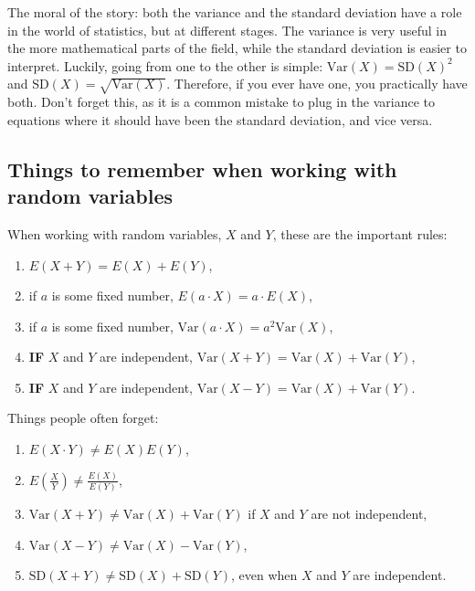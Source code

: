 \documentclass[]{book}
\providecommand{\tightlist}{%
  \setlength{\itemsep}{0pt}\setlength{\parskip}{0pt}}
\theoremstyle{definition}
\theoremstyle{definition}
\theoremstyle{definition}
\theoremstyle{remark}
\begin{document}
The moral of the story: both the variance and the standard deviation have a role in the world of statistics, but at different stages. The variance is very useful in the more mathematical parts of the field, while the standard deviation is easier to interpret. Luckily, going from one to the other is simple: \(\text{Var}(X) = \text{SD}(X)^2\) and \(\text{SD}(X) = \sqrt{\text{Var}(X)}\). Therefore, if you ever have one, you practically have both. Don't forget this, as it is a common mistake to plug in the variance to equations where it should have been the standard deviation, and vice versa.

\hypertarget{things-to-remember-when-working-with-random-variables}{%
\subsection{Things to remember when working with random variables}\label{things-to-remember-when-working-with-random-variables}}

When working with random variables, \(X\) and \(Y\), these are the important rules:

\begin{enumerate}
\def\labelenumi{\arabic{enumi}.}
\tightlist
\item
  \(E(X + Y) = E(X) + E(Y)\),
\item
  if \(a\) is some fixed number, \(E(a\cdot X) = a\cdot E(X)\),
\item
  if \(a\) is some fixed number, \(\text{Var}(a \cdot X) = a^2 \text{Var}(X)\),
\item
  \textbf{IF} \(X\) and \(Y\) are independent, \(\text{Var}(X + Y) = \text{Var}(X) + \text{Var}(Y)\),
\item
  \textbf{IF} \(X\) and \(Y\) are independent, \(\text{Var}(X - Y) = \text{Var}(X) + \text{Var}(Y)\).
\end{enumerate}

Things people often forget:

\begin{enumerate}
\def\labelenumi{\arabic{enumi}.}
\tightlist
\item
  \(E(X\cdot Y) \neq E(X)E(Y)\),
\item
  \(E\left(\frac{X}{Y}\right) \neq \frac{E(X)}{E(Y)}\),
\item
  \(\text{Var}(X+Y) \neq \text{Var}(X) + \text{Var}(Y)\) if \(X\) and \(Y\) are not independent,
\item
  \(\text{Var}(X - Y) \neq \text{Var}(X) - \text{Var}(Y)\),
\item
  \(\text{SD}(X + Y) \neq \text{SD}(X) + \text{SD}(Y)\), even when \(X\) and \(Y\) are independent.
\end{enumerate}
\end{document}
